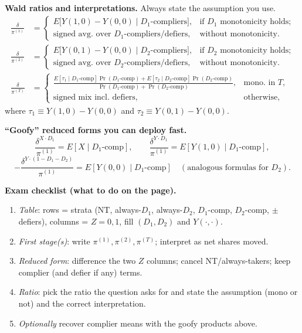 \documentclass[10pt]{article}
\begin{document}
\textbf{Wald ratios and interpretations.}  Always state the assumption you use.
\begin{align*}
\frac{\delta}{\pi^{(1)}} &=
\begin{cases}
E\!\big[Y(1,0)-Y(0,0)\mid D_1\text{-compliers}\big], & \text{if } D_1 \text{ monotonicity holds;}\\
\text{signed avg. over }D_1\text{-compliers/defiers}, & \text{without monotonicity.}
\end{cases}\\[4pt]
\frac{\delta}{\pi^{(2)}} &=
\begin{cases}
E\!\big[Y(0,1)-Y(0,0)\mid D_2\text{-compliers}\big], & \text{if } D_2 \text{ monotonicity holds;}\\
\text{signed avg. over }D_2\text{-compliers/defiers}, & \text{without monotonicity.}
\end{cases}\\[4pt]
\frac{\delta}{\pi^{(T)}} &= 
\begin{cases}
\displaystyle \frac{
E[\tau_1\mid D_1\text{-comp}]\Pr(D_1\text{-comp})
+E[\tau_2\mid D_2\text{-comp}]\Pr(D_2\text{-comp})
}{\Pr(D_1\text{-comp})+\Pr(D_2\text{-comp})},
& \text{mono. in }T,\\
\text{signed mix incl. defiers,} & \text{otherwise,}
\end{cases}
\end{align*}
where $\tau_1\equiv Y(1,0){-}Y(0,0)$ and $\tau_2\equiv Y(0,1){-}Y(0,0)$.

\textbf{``Goofy'' reduced forms you can deploy fast.}
\[
\frac{\delta^{X\cdot D_1}}{\pi^{(1)}}=E[X\mid D_1\text{-comp}],\qquad
\frac{\delta^{Y\cdot D_1}}{\pi^{(1)}}=E[Y(1,0)\mid D_1\text{-comp}],
\]
\[
-\frac{\delta^{Y\cdot(1-D_1-D_2)}}{\pi^{(1)}}=E[Y(0,0)\mid D_1\text{-comp}]
\quad(\text{analogous formulas for }D_2).
\]

\textbf{Exam checklist (what to do on the page).}
\begin{enumerate}
\item \emph{Table}: rows = strata (NT, always-$D_1$, always-$D_2$, $D_1$-comp, $D_2$-comp, $\pm$ defiers), columns = $Z{=}0,1$, fill $(D_1,D_2)$ and $Y(\cdot,\cdot)$.
\item \emph{First stage(s)}: write $\pi^{(1)},\pi^{(2)},\pi^{(T)}$; interpret as net shares moved.
\item \emph{Reduced form}: difference the two $Z$ columns; cancel NT/always-takers; keep complier (and defier if any) terms.
\item \emph{Ratio}: pick the ratio the question asks for and state the assumption (mono or not) and the correct interpretation.
\item \emph{Optionally} recover complier means with the goofy products above.
\end{enumerate}
\end{document}
